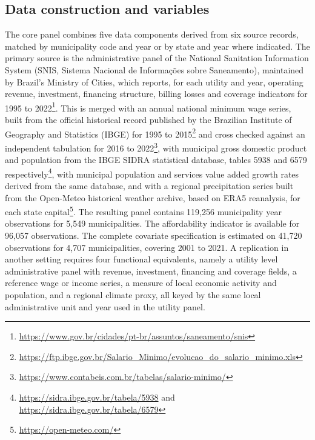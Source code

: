 \documentclass[pdflatex,sn-mathphys-num]{sn-jnl}%
\theoremstyle{thmstyleone}%
\theoremstyle{thmstyletwo}%
\theoremstyle{thmstylethree}%
\begin{document}
\subsection{Data construction and variables}\label{subsec_data}

The core panel combines five data components derived from six source records, matched by municipality code and year or by state and year where indicated. The primary source is the administrative panel of the National Sanitation Information System (SNIS, Sistema Nacional de Informações sobre Saneamento), maintained by Brazil's Ministry of Cities, which reports, for each utility and year, operating revenue, investment, financing structure, billing losses and coverage indicators for 1995 to 2022\footnote{\url{https://www.gov.br/cidades/pt-br/assuntos/saneamento/snis}}. This is merged with an annual national minimum wage series, built from the official historical record published by the Brazilian Institute of Geography and Statistics (IBGE) for 1995 to 2015\footnote{\url{https://ftp.ibge.gov.br/Salario_Minimo/evolucao_do_salario_minimo.xls}} and cross checked against an independent tabulation for 2016 to 2022\footnote{\url{https://www.contabeis.com.br/tabelas/salario-minimo/}}, with municipal gross domestic product and population from the IBGE SIDRA statistical database, tables 5938 and 6579 respectively\footnote{\url{https://sidra.ibge.gov.br/tabela/5938} and \url{https://sidra.ibge.gov.br/tabela/6579}}, with municipal population and services value added growth rates derived from the same database, and with a regional precipitation series built from the Open-Meteo historical weather archive, based on ERA5 reanalysis, for each state capital\footnote{\url{https://open-meteo.com/}}. The resulting panel contains 119,256 municipality year observations for 5,549 municipalities. The affordability indicator is available for 96,057 observations. The complete covariate specification is estimated on 41,720 observations for 4,707 municipalities, covering 2001 to 2021. A replication in another setting requires four functional equivalents, namely a utility level administrative panel with revenue, investment, financing and coverage fields, a reference wage or income series, a measure of local economic activity and population, and a regional climate proxy, all keyed by the same local administrative unit and year used in the utility panel.
\end{document}
